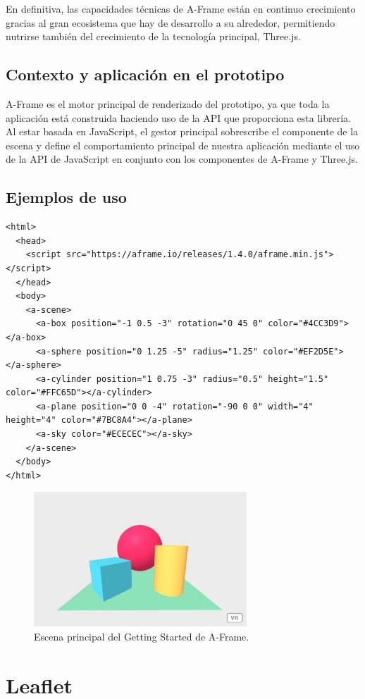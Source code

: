 \documentclass[a4paper, 11pt]{book}
\begin{document}
En definitiva, las capacidades técnicas de A-Frame están en continuo crecimiento gracias al gran ecosistema que hay de desarrollo a su alrededor, permitiendo nutrirse también del crecimiento de la tecnología principal, Three.js.
\subsection{Contexto y aplicación en el prototipo}
A-Frame es el motor principal de renderizado del prototipo, ya que toda la aplicación está construida haciendo uso de la API que proporciona esta librería. Al estar basada en JavaScript, el gestor principal sobrescribe el componente de la escena y define el comportamiento principal de nuestra aplicación mediante el uso de la API de JavaScript en conjunto con los componentes de A-Frame y Three.js.
\subsection{Ejemplos de uso}
\begin{verbatim}
<html>
  <head>
    <script src="https://aframe.io/releases/1.4.0/aframe.min.js"></script>
  </head>
  <body>
    <a-scene>
      <a-box position="-1 0.5 -3" rotation="0 45 0" color="#4CC3D9"></a-box>
      <a-sphere position="0 1.25 -5" radius="1.25" color="#EF2D5E"></a-sphere>
      <a-cylinder position="1 0.75 -3" radius="0.5" height="1.5" color="#FFC65D"></a-cylinder>
      <a-plane position="0 0 -4" rotation="-90 0 0" width="4" height="4" color="#7BC8A4"></a-plane>
      <a-sky color="#ECECEC"></a-sky>
    </a-scene>
  </body>
</html>
\end{verbatim}
\begin{figure}[h]
  \centering
  \includegraphics[width=8cm, keepaspectratio]{img/gettingstarted_Aframe.jpg}
  \caption{Escena principal del Getting Started de A-Frame.}
  \label{fig:AFrameGettingStarted}
\end{figure}
\section{Leaflet}
\label{sec:leaflet}
\end{document}
